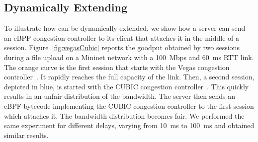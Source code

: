 \subsection{Dynamically Extending \tcpls}
%

To illustrate how \tcpls can be dynamically extended, we show how a server can 
send an eBPF congestion controller to its client that attaches it in the middle 
of a \tcpls session. Figure~\ref{fig:vegasCubic} reports the goodput obtained 
by two \tcpls sessions during a file upload on a Mininet network with a 
100~Mbps and 60~ms RTT link.
The orange curve is the first \tcpls session that starts with the Vegas 
congestion controller~\cite{brakmo1994tcp}. It rapidly reaches the 
full capacity of the link. Then, a second \tcpls session, depicted in blue, is 
started with the CUBIC congestion controller~\cite{rfc8312}. This quickly 
results in an unfair distribution of the bandwidth. The server then sends an 
eBPF bytecode implementing the CUBIC congestion controller to the first \tcpls 
session which attaches it. The bandwidth distribution becomes fair. We 
performed the same experiment for different delays, varying from 10~ms to 100~ms
and obtained similar results.

